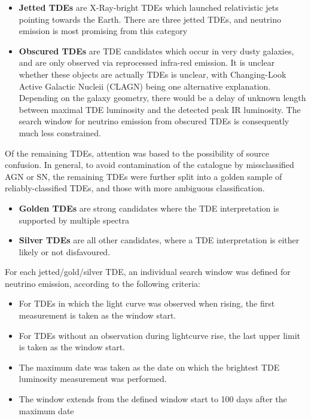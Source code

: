 \documentclass[twocolumn, tighten, linenumbers]{aastex62}
\begin{document}
\begin{itemize}
	\item \textbf{Jetted TDEs} are X-Ray-bright TDEs which launched relativistic jets pointing towards the Earth. There are three jetted TDEs, and neutrino emission is most promising from this category
	
	\item \textbf{Obscured TDEs} are TDE candidates which occur in very dusty galaxies, and are only observed via reprocessed infra-red emission. It is unclear whether these objects are actually TDEs is unclear, with Changing-Look Active Galactic Nucleii (CLAGN) being one alternative explanation. Depending on the galaxy geometry, there would be a delay of unknown length between maximal TDE luminosity and the detected peak IR luminosity. The search window for neutrino emission from obscured TDEs is consequently much less constrained.
\end{itemize}
Of the remaining TDEs, attention was based to the possibility of source confusion. In general, to avoid contamination of the catalogue by missclassified AGN or SN, the remaining TDEs were further split into a golden sample of reliably-classified TDEs, and those with more ambiguous classification.
\begin{itemize}
	\item \textbf{Golden TDEs} are strong candidates where the TDE interpretation is supported by multiple spectra
	\item \textbf{Silver TDEs} are all other candidates, where a TDE interpretation is either likely or not disfavoured.
\end{itemize}

For each jetted/gold/silver TDE, an individual search window was defined for neutrino emission, according to the following criteria:

\begin{itemize}
	\item For TDEs in which the light curve was observed when rising, the first measurement is taken as the window start.
	
	\item For TDEs without an observation during lightcurve rise, the last upper limit is taken as the window start.
	
	\item The maximum date was taken as the date on which the brightest TDE luminosity measurement was performed.
	
	\item The window extends from the defined window start to 100 days after the maximum date
	
\end{itemize}
\end{document}
